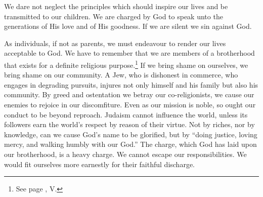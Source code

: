 We dare not neglect the principles
which should inspire our lives and be transmitted
to our children. We are charged
by God to speak unto the generations of
His love and of His goodness. If we are
silent we sin against God.

As individuals, if not as parents, we
must endeavour to render our lives acceptable
to God. We have to remember
that we are members of a brotherhood
that exists for a definite religious
purpose.\footnote{See page \pageref{brotherhood}, V.}
If we bring shame on ourselves, we bring
shame on our community. A Jew, who
is dishonest in commerce, who engages in
degrading pursuits, injures not only himself
and his family but also his community.
By greed and ostentation we betray our
co-religionists, we cause our enemies to
rejoice in our discomfiture. Even as our
mission is noble, so ought our conduct to
be beyond reproach. Judaism cannot influence
the world, unless its followers earn
the world’s respect by reason of their
virtue. Not by riches, nor by knowledge,
can we cause God’s name to be glorified,
but by “doing justice, loving mercy,
and walking humbly with our God.” The
charge, which God has laid upon our
brotherhood, is a heavy charge. We
cannot escape our responsibilities. We
would fit ourselves more earnestly for their
faithful discharge.
